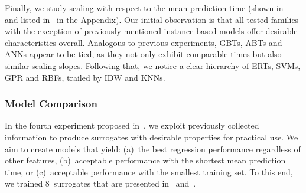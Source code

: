 Finally, we study scaling with respect to the mean prediction time (shown
in~ and listed in~ in
the Appendix). Our initial observation is that all tested
families with the exception of previously mentioned instance-based
models offer desirable characteristics overall. Analogous to previous
experiments, GBTs, ABTs and ANNs appear to be tied, as they not only exhibit
comparable times but also similar scaling slopes. Following that, we notice a
clear hierarchy of ERTs, SVMs, GPR and RBFs, trailed by IDW and KNNs.


\subsubsection{Model Comparison}

In the fourth experiment proposed
in~, we exploit previously collected information
to produce surrogates with desirable properties for practical use. We
aim to create models that yield: (a)~the best regression performance regardless
of other features, (b)~acceptable performance with the shortest mean
prediction time, or (c)~acceptable performance with the smallest training set.
To this end, we trained 8~surrogates that are presented in~
and~.

